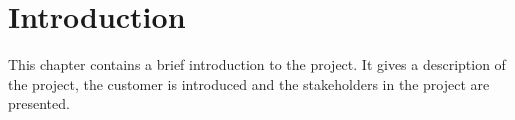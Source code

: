 \chapter{Introduction}

This chapter contains a brief introduction to the project. It gives a description of the project, the customer is introduced and the stakeholders in the project are presented.
